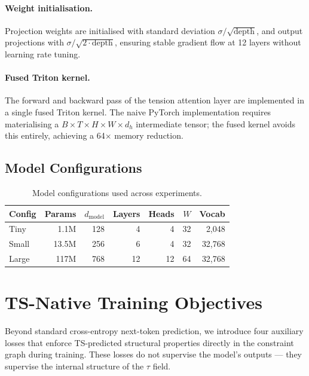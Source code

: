 \documentclass[10pt,a4paper]{article}
\begin{document}
\paragraph{Weight initialisation.} Projection weights are initialised with standard deviation $\sigma / \sqrt{\text{depth}}$, and output projections with $\sigma / \sqrt{2 \cdot \text{depth}}$, ensuring stable gradient flow at 12 layers without learning rate tuning.

\paragraph{Fused Triton kernel.} The forward and backward pass of the tension attention layer are implemented in a single fused Triton kernel. The naive PyTorch implementation requires materialising a $B \times T \times H \times W \times d_h$ intermediate tensor; the fused kernel avoids this entirely, achieving a 64$\times$ memory reduction.

\subsection{Model Configurations}

\begin{table}[h]
\centering
\caption{Model configurations used across experiments.}
\label{tab:configs}
\vspace{4pt}
\begin{tabular}{lrrrrrr}
\toprule
Config & Params & $d_{\text{model}}$ & Layers & Heads & $W$ & Vocab \\
\midrule
Tiny & 1.1M & 128 & 4 & 4 & 32 & 2,048 \\
Small & 13.5M & 256 & 6 & 4 & 32 & 32,768 \\
Large & 117M & 768 & 12 & 12 & 64 & 32,768 \\
\bottomrule
\end{tabular}
\end{table}

\section{TS-Native Training Objectives}

Beyond standard cross-entropy next-token prediction, we introduce four auxiliary losses that enforce TS-predicted structural properties directly in the constraint graph during training. These losses do not supervise the model's outputs --- they supervise the internal structure of the $\tau$ field.
\end{document}
